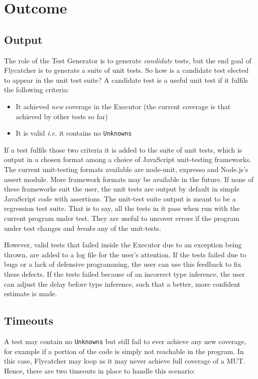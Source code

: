 \section{Outcome}
\subsection{Output}
The role of the \textsf{Test Generator} is to generate \emph{candidate} tests, but the end goal of \textsf{Flycatcher} is to generate a suite of unit tests. So how is a candidate test elected to appear in the unit test suite? A candidate test is a useful unit test if it fulfils the following criteria:

\begin{itemize}
   \item It achieved \emph{new} coverage in the \textsf{Executor} (the current coverage is that achieved by other tests so far)
   \item It is valid \emph{i.e.} it contains no \texttt{Unknowns}
\end{itemize}

If a test fulfils those two criteria it is added to the suite of unit tests, which is output in a chosen format among a choice of JavaScript unit-testing frameworks. The current unit-testing formats available are \textsf{node-unit}, \textsf{expresso} and \textsf{Node.js}'s \textsf{assert} module. More framework formats may be available in the future. If none of these frameworks suit the user, the unit tests are output by default in simple JavaScript code with assertions. The unit-test suite output is meant to be a regression test suite. That is to say, all the tests in it pass when run with the current program under test. They are useful to uncover errors if the program under test changes and \emph{breaks} any of the unit-tests.

However, valid tests that failed inside the \textsf{Executor} due to an exception being thrown, are added to a log file for the user's attention. If the tests failed due to bugs or a lack of defensive programming, the user can use this feedback to fix these defects. If the tests failed because of an incorrect type inference, the user can adjust the delay before type inference, such that a better, more confident estimate is made.

\subsection{Timeouts}
A test may contain no \texttt{Unknowns} but still fail to ever achieve any new coverage, for example if a portion of the code is simply not reachable in the program. In this case, \textsf{Flycatcher} may loop as it may never achieve full coverage of a MUT. Hence, there are two timeouts in place to handle this scenario:

